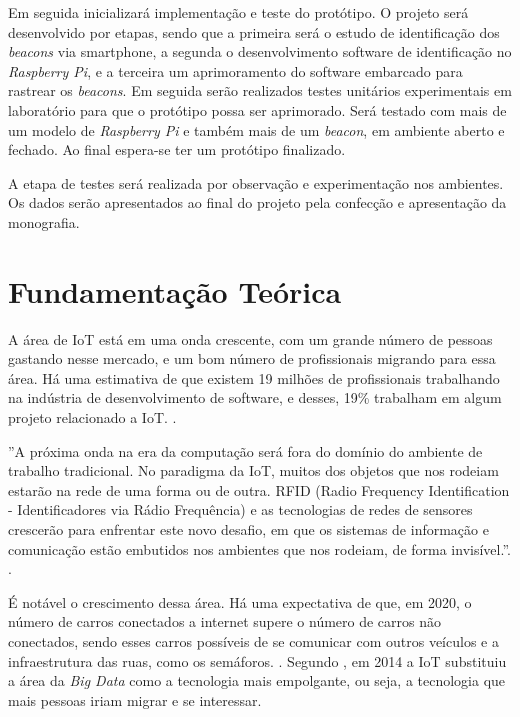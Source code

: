 \documentclass[
	12pt,				%
	openright,			%
	oneside,			%
	a4paper,			%
	chapter=TITLE,		%
	english,			%
	french,				%
	spanish,			%
	brazil				%
	]{abntex2}
\begin{document}
{Em seguida inicializará implementação e teste do protótipo. O projeto será desenvolvido por etapas, sendo que a primeira será o estudo de identificação dos \textit{beacons} via smartphone, a segunda o desenvolvimento software de identificação no \textit{Raspberry Pi}, e a terceira um aprimoramento do software embarcado para rastrear os \textit{beacons}. Em seguida serão realizados testes unitários experimentais em laboratório para que o protótipo possa ser aprimorado. Será testado com mais de um modelo de \textit{Raspberry Pi} e também mais de um \textit{beacon}, em ambiente aberto e fechado. Ao final espera-se ter um protótipo finalizado.

A etapa de testes será realizada por observação e experimentação nos ambientes. Os dados serão apresentados ao final do projeto pela confecção e apresentação da monografia.


\chapter{Fundamentação Teórica}

A área de IoT está em uma onda crescente, com um grande número de pessoas gastando nesse mercado, e um bom número de profissionais migrando para essa área. Há uma estimativa de que existem 19 milhões de profissionais trabalhando na indústria de desenvolvimento de software, e desses, 19\% trabalham em algum projeto relacionado a IoT. \cite{cw-iot}.

\begin{citacao}
''A próxima onda na era da computação será fora do domínio do ambiente de trabalho tradicional. No paradigma da IoT, muitos dos objetos que nos rodeiam estarão na rede de uma forma ou de outra. RFID (Radio Frequency Identification - Identificadores via Rádio Frequência) e as tecnologias de redes de sensores crescerão para enfrentar este novo desafio, em que os sistemas de informação e comunicação estão embutidos nos ambientes que nos rodeiam, de forma invisível.''. \cite{iot-article}. 
\end{citacao}

É notável o crescimento dessa área. Há uma expectativa de que, em 2020, o número de carros conectados a internet supere o número de carros não conectados, sendo esses carros possíveis de se comunicar com outros veículos e a infraestrutura das ruas, como os semáforos. \cite{goldmansachs-iot}. Segundo , em 2014 a IoT substituiu a área da \textit{Big Data} como a tecnologia mais empolgante, ou seja, a tecnologia que mais pessoas iriam migrar e se interessar. 

}
\end{document}
